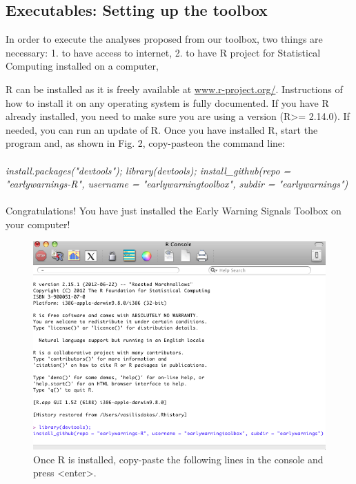 \documentclass[12pt,a4paper,final]{article}
\begin{document}
\begin{doublespacing}
\section{Executables: Setting up the toolbox}
In order to execute the analyses proposed from our toolbox, two things are necessary:
1. to have access to internet,
2. to have R project for Statistical Computing installed on a computer,

R can be installed as it is freely available at \url{www.r-project.org/}. Instructions of how to install it on any operating system is fully documented. If you have R already installed, you need to make sure you are using a version (R>= 2.14.0). If needed, you can run an update of R.
Once you have installed R, start the program and, as shown in Fig. 2, copy-pasteon the command line:\\
\\
\textit{install.packages("devtools"); library(devtools); install\_github(repo = "earlywarnings-R", username = "earlywarningtoolbox", subdir = "earlywarnings")}\\
\\
Congratulations! You have just installed the Early Warning Signals Toolbox on your computer!

\begin{figure}[ht]
\begin{center}
\includegraphics[scale=0.5]{R_install_ews.png}
\caption{Once R is installed, copy-paste the following lines in the console and press <enter>.}
\end{center}
\end{figure}


\end{doublespacing}
\end{document}
